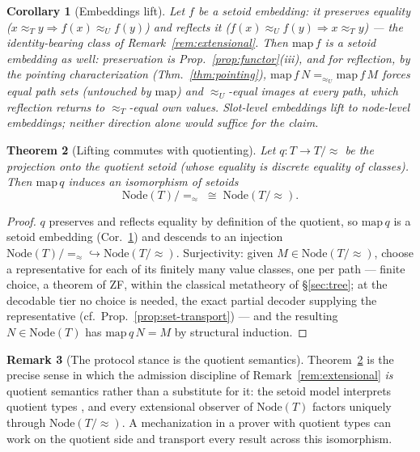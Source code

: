 \documentclass[11pt]{article}
\newtheorem{theorem}{Theorem}[section]
\newtheorem{corollary}[theorem]{Corollary}
\theoremstyle{definition}
\newtheorem{remark}[theorem]{Remark}
\newcommand{\NodeT}[1]{\mathrm{Node}(#1)}
\newcommand{\eqS}{=_{\approx}}                     %
\begin{document}
\begin{corollary}[Embeddings lift]\label{cor:embed}
Let $f$ be a \emph{setoid embedding}: it preserves equality ($x \approx_T y
\Rightarrow f(x) \approx_U f(y)$) \emph{and} reflects it ($f(x) \approx_U f(y)
\Rightarrow x \approx_T y$) --- the identity-bearing class of
Remark~\ref{rem:extensional}. Then $\mathrm{map}\,f$ is a setoid embedding as well:
preservation is Prop.~\ref{prop:functor}(iii), and for reflection, by the pointing
characterization (Thm.~\ref{thm:pointing}),
$\mathrm{map}\,f\,N =_{\approx_U} \mathrm{map}\,f\,M$ forces equal path sets (untouched by
$\mathrm{map}$) and $\approx_U$-equal images at every path, which reflection returns to
$\approx_T$-equal own values. Slot-level embeddings
lift to node-level embeddings; neither direction alone would suffice for the claim.
\end{corollary}

\begin{theorem}[Lifting commutes with quotienting]\label{thm:quotient}
Let $q : T \to T/\!\approx$ be the projection onto the quotient setoid (whose
equality is discrete equality of classes). Then $\mathrm{map}\,q$ induces an
isomorphism of setoids
\[
\NodeT{T}/\!\eqS \;\cong\; \NodeT{T/\!\approx}.
\]
\end{theorem}

\begin{proof}
$q$ preserves and reflects equality by definition of the quotient, so
$\mathrm{map}\,q$ is a setoid embedding (Cor.~\ref{cor:embed}) and descends to an
injection $\NodeT{T}/\!\eqS \hookrightarrow \NodeT{T/\!\approx}$. Surjectivity:
given $M \in \NodeT{T/\!\approx}$, choose a representative for each of its finitely
many value classes, one per path --- finite choice, a theorem of ZF, within the classical
metatheory of \S\ref{sec:tree}; at the decodable tier no choice is needed, the
exact partial decoder supplying the representative (cf.\
Prop.~\ref{prop:set-transport}) --- and the resulting $N \in \NodeT{T}$ has
$\mathrm{map}\,q\,N = M$ by structural induction.
\end{proof}

\begin{remark}[The protocol stance is the quotient semantics]\label{rem:hofmann}
Theorem~\ref{thm:quotient} is the precise sense in which the admission discipline of
Remark~\ref{rem:extensional} \emph{is} quotient semantics rather than a substitute
for it: the setoid model interprets quotient types \cite{hofmann}, and every
extensional observer of $\NodeT{T}$ factors uniquely through $\NodeT{T/\!\approx}$.
A mechanization in a prover with quotient types can work on the quotient side and
transport every result across this isomorphism.
\end{remark}
\end{document}
